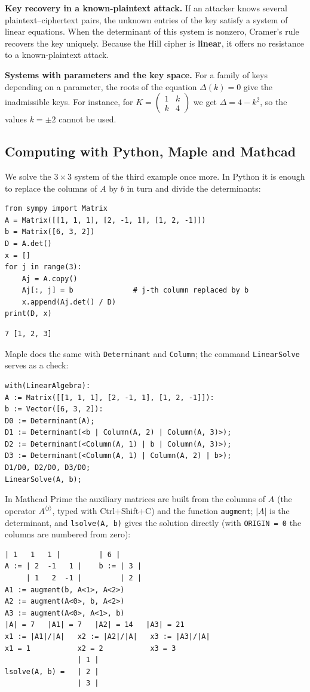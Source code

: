 \textbf{Key recovery in a known-plaintext attack.}
If an attacker knows several plaintext–ciphertext pairs, the unknown entries of
the key satisfy a system of linear equations. When the determinant of this
system is nonzero, Cramer’s rule recovers the key uniquely. Because the Hill
cipher is \textbf{linear}, it offers no resistance to a known-plaintext attack.

\textbf{Systems with parameters and the key space.}
For a family of keys depending on a parameter, the roots of the equation
$\Delta(k)=0$ give the inadmissible keys. For instance, for
$K=\begin{pmatrix}1&k\\k&4\end{pmatrix}$ we get $\Delta=4-k^2$, so the values
$k=\pm2$ cannot be used.

\subsection{Computing with Python, Maple and Mathcad}
We solve the $3\times3$ system of the third example once more. In Python it is
enough to replace the columns of $A$ by $b$ in turn and divide the determinants:
\begin{Verbatim}[fontsize=\footnotesize,frame=single,label={\small Python}]
from sympy import Matrix
A = Matrix([[1, 1, 1], [2, -1, 1], [1, 2, -1]])
b = Matrix([6, 3, 2])
D = A.det()
x = []
for j in range(3):
    Aj = A.copy()
    Aj[:, j] = b              # j-th column replaced by b
    x.append(Aj.det() / D)
print(D, x)
\end{Verbatim}
\begin{Verbatim}[fontsize=\footnotesize,frame=single,label={\small Output}]
7 [1, 2, 3]
\end{Verbatim}
Maple does the same with \texttt{Determinant} and \texttt{Column}; the command
\texttt{LinearSolve} serves as a check:
\begin{Verbatim}[fontsize=\footnotesize,frame=single,label={\small Maple}]
with(LinearAlgebra):
A := Matrix([[1, 1, 1], [2, -1, 1], [1, 2, -1]]):
b := Vector([6, 3, 2]):
D0 := Determinant(A);
D1 := Determinant(<b | Column(A, 2) | Column(A, 3)>);
D2 := Determinant(<Column(A, 1) | b | Column(A, 3)>);
D3 := Determinant(<Column(A, 1) | Column(A, 2) | b>);
D1/D0, D2/D0, D3/D0;
LinearSolve(A, b);
\end{Verbatim}
In Mathcad Prime the auxiliary matrices are built from the columns of $A$
(the operator $A^{\langle j\rangle}$, typed with Ctrl+Shift+C) and the function
\texttt{augment}; $|A|$ is the determinant, and \texttt{lsolve(A, b)} gives the
solution directly (with \texttt{ORIGIN = 0} the columns are numbered from zero):
\begin{Verbatim}[fontsize=\footnotesize,frame=single,label={\small Mathcad}]
     | 1   1   1 |         | 6 |
A := | 2  -1   1 |    b := | 3 |
     | 1   2  -1 |         | 2 |
A1 := augment(b, A<1>, A<2>)
A2 := augment(A<0>, b, A<2>)
A3 := augment(A<0>, A<1>, b)
|A| = 7   |A1| = 7   |A2| = 14   |A3| = 21
x1 := |A1|/|A|   x2 := |A2|/|A|   x3 := |A3|/|A|
x1 = 1           x2 = 2           x3 = 3
                 | 1 |
lsolve(A, b) =   | 2 |
                 | 3 |
\end{Verbatim}

